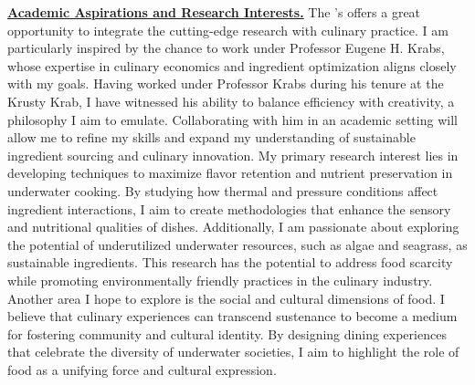 \textbf{\underline{Academic Aspirations and Research Interests.}}
The \GetUniversityName's \GetProgramName offers a great opportunity to integrate the cutting-edge research with culinary \newpage\noindent practice. I am particularly inspired by the chance to work under Professor Eugene H. Krabs, whose expertise in culinary economics and ingredient optimization aligns closely with my goals. Having worked under Professor Krabs during his tenure at the Krusty Krab, I have witnessed his ability to balance efficiency with creativity, a philosophy I aim to emulate. Collaborating with him in an academic setting will allow me to refine my skills and expand my understanding of sustainable ingredient sourcing and culinary innovation.
My primary research interest lies in developing techniques to maximize flavor retention and nutrient preservation in underwater cooking. By studying how thermal and pressure conditions affect ingredient interactions, I aim to create methodologies that enhance the sensory and nutritional qualities of dishes. Additionally, I am passionate about exploring the potential of underutilized underwater resources, such as algae and seagrass, as sustainable ingredients. This research has the potential to address food scarcity while promoting environmentally friendly practices in the culinary industry.
Another area I hope to explore is the social and cultural dimensions of food. I believe that culinary experiences can transcend sustenance to become a medium for fostering community and cultural identity. By designing dining experiences that celebrate the diversity of underwater societies, I aim to highlight the role of food as a unifying force and cultural expression. \\ \vspace{-4pt}
